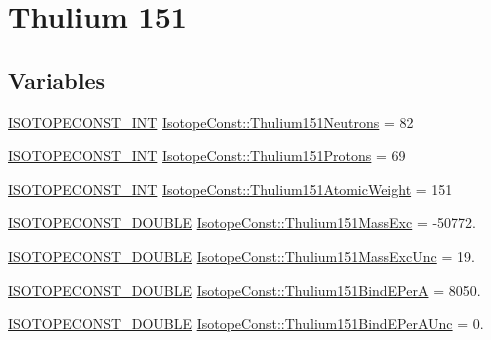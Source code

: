 \hypertarget{group___isotope_const-_thulium-_tm151}{}\section{Thulium 151}
\label{group___isotope_const-_thulium-_tm151}
\subsection*{Variables}
\begin{DoxyCompactItemize}
\item 
\mbox{\hyperlink{group___isotope_const-_macros_ga5f18360b3e99483a35c32d789e62621c}{I\+S\+O\+T\+O\+P\+E\+C\+O\+N\+S\+T\+\_\+\+I\+NT}} \mbox{\hyperlink{group___isotope_const-_thulium-_tm151_ga2468c36827f31515f20e96dbc5de1609}{Isotope\+Const\+::\+Thulium151\+Neutrons}} = 82
\item 
\mbox{\hyperlink{group___isotope_const-_macros_ga5f18360b3e99483a35c32d789e62621c}{I\+S\+O\+T\+O\+P\+E\+C\+O\+N\+S\+T\+\_\+\+I\+NT}} \mbox{\hyperlink{group___isotope_const-_thulium-_tm151_ga1d901b8e360a57dc3a515b695c2a1df1}{Isotope\+Const\+::\+Thulium151\+Protons}} = 69
\item 
\mbox{\hyperlink{group___isotope_const-_macros_ga5f18360b3e99483a35c32d789e62621c}{I\+S\+O\+T\+O\+P\+E\+C\+O\+N\+S\+T\+\_\+\+I\+NT}} \mbox{\hyperlink{group___isotope_const-_thulium-_tm151_ga5a2387244d03c09dcb2e2fed1b05c917}{Isotope\+Const\+::\+Thulium151\+Atomic\+Weight}} = 151
\item 
\mbox{\hyperlink{group___isotope_const-_macros_ga8f45a7272ce02c0b4c65c44636ed719a}{I\+S\+O\+T\+O\+P\+E\+C\+O\+N\+S\+T\+\_\+\+D\+O\+U\+B\+LE}} \mbox{\hyperlink{group___isotope_const-_thulium-_tm151_gadaccc647effa8ad634dae3753fb8d9bd}{Isotope\+Const\+::\+Thulium151\+Mass\+Exc}} = -\/50772.
\item 
\mbox{\hyperlink{group___isotope_const-_macros_ga8f45a7272ce02c0b4c65c44636ed719a}{I\+S\+O\+T\+O\+P\+E\+C\+O\+N\+S\+T\+\_\+\+D\+O\+U\+B\+LE}} \mbox{\hyperlink{group___isotope_const-_thulium-_tm151_ga2e307386fdd5371bcd519242a9cf8eb1}{Isotope\+Const\+::\+Thulium151\+Mass\+Exc\+Unc}} = 19.
\item 
\mbox{\hyperlink{group___isotope_const-_macros_ga8f45a7272ce02c0b4c65c44636ed719a}{I\+S\+O\+T\+O\+P\+E\+C\+O\+N\+S\+T\+\_\+\+D\+O\+U\+B\+LE}} \mbox{\hyperlink{group___isotope_const-_thulium-_tm151_ga9a4111d1e722e9c9e31905bfe407139b}{Isotope\+Const\+::\+Thulium151\+Bind\+E\+PerA}} = 8050.
\item 
\mbox{\hyperlink{group___isotope_const-_macros_ga8f45a7272ce02c0b4c65c44636ed719a}{I\+S\+O\+T\+O\+P\+E\+C\+O\+N\+S\+T\+\_\+\+D\+O\+U\+B\+LE}} \mbox{\hyperlink{group___isotope_const-_thulium-_tm151_ga4a4ed68155cffebaa0acf73752713046}{Isotope\+Const\+::\+Thulium151\+Bind\+E\+Per\+A\+Unc}} = 0.

\end{DoxyCompactItemize}
